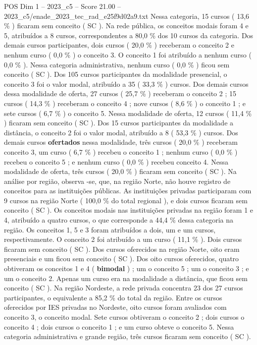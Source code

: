 \begin{textsample}{POS Dim 1 – 2023\_c5 – Score 21.00 – 2023\_c5/enade\_2023\_tec\_rad\_e25f9d02a9.txt}
Nessa categoria, 15 cursos ( 13,6 \% ) ficaram sem conceito ( SC ).
Na rede pública, os conceitos modais foram 4 e 5, atribuídos a 8 cursos, correspondentes a 80,0 \% dos 10 cursos da categoria.
Dos demais cursos participantes, dois cursos ( 20,0 \% ) receberam o conceito 2 e nenhum curso ( 0,0 \% ) o conceito 3.
O conceito 1 foi atribuído a nenhum curso ( 0,0 \% ).
Nessa categoria administrativa, nenhum curso ( 0,0 \% ) ficou sem conceito ( SC ).
Dos 105 cursos participantes da modalidade presencial, o conceito 3 foi o valor modal, atribuído a 35 ( 33,3 \% ) cursos.
Dos demais cursos dessa modalidade de oferta, 27 cursos ( 25,7 \% ) receberam o conceito 2 ; 15 cursos ( 14,3 \% ) receberam o conceito 4 ; nove cursos ( 8,6 \% ) o conceito 1 ; e sete cursos ( 6,7 \% ) o conceito 5.
Nessa modalidade de oferta, 12 cursos ( 11,4 \% ) ficaram sem conceito ( SC ).
Dos 15 cursos participantes da modalidade a distância, o conceito 2 foi o valor modal, atribuído a 8 ( 53,3 \% ) cursos.
Dos demais cursos \textbf{ofertados} nessa modalidade, três cursos ( 20,0 \% ) receberam conceito 3, um curso ( 6,7 \% ) recebeu o conceito 1 ; nenhum curso ( 0,0 \% ) recebeu o conceito 5 ; e nenhum curso ( 0,0 \% ) recebeu conceito 4.
Nessa modalidade de oferta, três cursos ( 20,0 \% ) ficaram sem conceito ( SC ).
Na análise por região, observa -se, que, na região Norte, não houve registro de conceitos para as instituições públicas.
As instituições privadas participaram com 9 cursos na região Norte ( 100,0 \% do total regional ), e dois cursos ficaram sem conceito ( SC ).
Os conceitos modais nas instituições privadas na região foram 1 e 4, atribuído a quatro cursos, o que corresponde a 44,4 \% dessa categoria na região.
Os conceitos 1, 5 e 3 foram atribuídos a dois, um e um cursos, respectivamente.
O conceito 2 foi atribuído a um curso ( 11,1 \% ).
Dois cursos ficaram sem conceito ( SC ).
Dos cursos oferecidos na região Norte, oito eram presenciais e um ficou sem conceito ( SC ).
Dos oito cursos oferecidos, quatro obtiveram os conceitos 1 e 4 ( \textbf{bimodal} ) ; um o conceito 5 ; um o conceito 3 ; e um o conceito 2.
Apenas um curso era na modalidade a distância, que ficou sem conceito ( SC ).
Na região Nordeste, a rede privada concentra 23 dos 27 cursos participantes, o equivalente a 85,2 \% do total da região.
Entre os cursos oferecidos por IES privadas no Nordeste, oito cursos foram avaliados com conceito 3, o conceito modal.
Sete cursos obtiveram o conceito 2 ; dois cursos o conceito 4 ; dois cursos o conceito 1 ; e um curso obteve o conceito 5.
Nessa categoria administrativa e grande região, três cursos ficaram sem conceito ( SC ).

\end{textsample}
